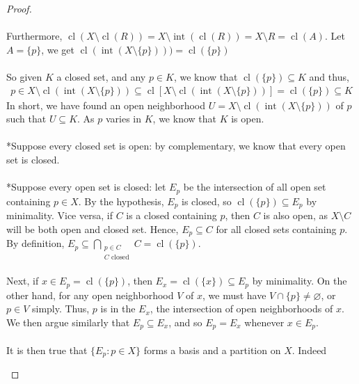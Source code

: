 \documentclass{treatise}
\begin{document}
\begin{proof}
\\
\\
Furthermore, $\operatorname{cl} (X \setminus \operatorname{cl}(R)) = X \setminus \operatorname{int}(\operatorname{cl}(R)) = X \setminus R = \operatorname{cl}(A)$. Let $A = \{ p \}$, we get $\operatorname{cl}(\operatorname{int}(X \setminus \{ p \}))) = \operatorname{cl}(\{ p \})$
\\
\\
So given $K$ a closed set, and any $p \in K$, we know that $\operatorname{cl}(\{ p \}) \subseteq K$ and thus,
\begin{align*}
    p \in X \setminus \operatorname{cl}(\operatorname{int}(X \setminus \{ p \})) \subseteq \operatorname{cl} [X \setminus \operatorname{cl}(\operatorname{int}(X \setminus \{ p \}))] = \operatorname{cl}(\{ p \}) \subseteq K
\end{align*}
In short, we have found an open neighborhood $U = X \setminus \operatorname{cl}(\operatorname{int}(X \setminus \{ p \}))$ of $p$ such that $U \subseteq K$. As $p$ varies in $K$, we know that $K$ is open.
\\
\\
*Suppose every closed set is open: by complementary, we know that every open set is closed.
\\
\\
*Suppose every open set is closed: let $E_p$ be the intersection of all open set containing $p \in X$. By the hypothesis, $E_p$ is closed, so $\operatorname{cl}(\{ p \}) \subseteq E_p$ by minimality. Vice versa, if $C$ is a closed containing $p$, then $C$ is also open, as $X \setminus C$ will be both open and closed set. Hence, $E_p \subseteq C$ for all closed sets containing $p$. By definition, $E_p \subseteq \bigcap_{\substack{p \in C \\ C \text{ closed}}} C = \operatorname{cl}(\{ p \})$.
\\
\\
Next, if $x \in E_p = \operatorname{cl}(\{ p \})$, then $E_x = \operatorname{cl}(\{ x \}) \subseteq E_p$ by minimality. On the other hand, for any open neighborhood $V$ of $x$, we must have $V \cap \{ p \} \neq \varnothing$, or $p \in V$ simply. Thus, $p$ is in the $E_x$, the intersection of open neighborhoods of $x$. We then argue similarly that $E_p \subseteq E_x$, and so $E_p = E_x$ whenever $x \in E_p$.
\\
\\
It is then true that $\{ E_p : p \in X \}$ forms a basis and a partition on $X$. Indeed
\begin{enumerate}

\end{enumerate}
\end{proof}
\end{document}
